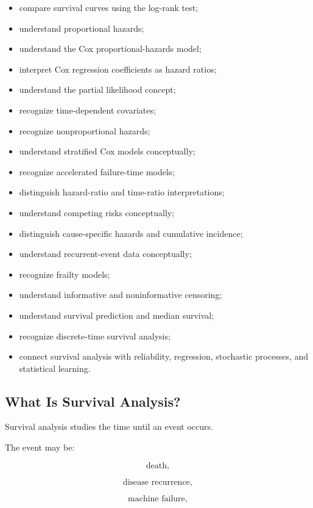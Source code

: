 {\begin{itemize}
    \item compare survival curves using the log-rank test;
    \item understand proportional hazards;
    \item understand the Cox proportional-hazards model;
    \item interpret Cox regression coefficients as hazard ratios;
    \item understand the partial likelihood concept;
    \item recognize time-dependent covariates;
    \item recognize nonproportional hazards;
    \item understand stratified Cox models conceptually;
    \item recognize accelerated failure-time models;
    \item distinguish hazard-ratio and time-ratio interpretations;
    \item understand competing risks conceptually;
    \item distinguish cause-specific hazards and cumulative incidence;
    \item understand recurrent-event data conceptually;
    \item recognize frailty models;
    \item understand informative and noninformative censoring;
    \item understand survival prediction and median survival;
    \item recognize discrete-time survival analysis;
    \item connect survival analysis with reliability, regression,
          stochastic processes, and statistical learning.
\end{itemize}
}

\subsection{What Is Survival Analysis?}
\label{subsec:what-is-survival-analysis}

Survival analysis studies the time until an event occurs.

The event may be:

\[
\boxed{
\text{death},
}
\]

\[
\boxed{
\text{disease recurrence},
}
\]

\[
\boxed{
\text{machine failure},
}
\]

